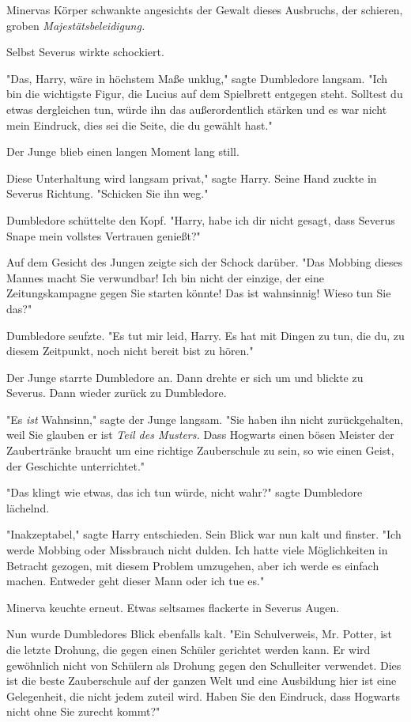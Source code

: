 {Minervas Körper schwankte angesichts der Gewalt dieses Ausbruchs, der schieren, groben \emph{Majestätsbeleidigung.}

Selbst Severus wirkte schockiert.

"Das, Harry, wäre in höchstem Maße unklug," sagte Dumbledore langsam. "Ich bin die wichtigste Figur, die Lucius auf dem Spielbrett entgegen steht. Solltest du etwas dergleichen tun, würde ihn das außerordentlich stärken und es war nicht mein Eindruck, dies sei die Seite, die du gewählt hast."

Der Junge blieb einen langen Moment lang still.

Diese Unterhaltung wird langsam privat," sagte Harry. Seine Hand zuckte in Severus Richtung. "Schicken Sie ihn weg."

Dumbledore schüttelte den Kopf. "Harry, habe ich dir nicht gesagt, dass Severus Snape mein vollstes Vertrauen genießt?"

Auf dem Gesicht des Jungen zeigte sich der Schock darüber. "Das Mobbing dieses Mannes macht Sie verwundbar! Ich bin nicht der einzige, der eine Zeitungskampagne gegen Sie starten könnte! Das ist wahnsinnig! Wieso tun Sie das?"

Dumbledore seufzte. "Es tut mir leid, Harry. Es hat mit Dingen zu tun, die du, zu diesem Zeitpunkt, noch nicht bereit bist zu hören."

Der Junge starrte Dumbledore an. Dann drehte er sich um und blickte zu Severus. Dann wieder zurück zu Dumbledore.

"Es \emph{ist} Wahnsinn," sagte der Junge langsam. "Sie haben ihn nicht zurückgehalten, weil Sie glauben er ist \emph{Teil des Musters.} Dass Hogwarts einen bösen Meister der Zaubertränke braucht um eine richtige Zauberschule zu sein, so wie einen Geist, der Geschichte unterrichtet."

"Das klingt wie etwas, das ich tun würde, nicht wahr?" sagte Dumbledore lächelnd.

"Inakzeptabel," sagte Harry entschieden. Sein Blick war nun kalt und finster. "Ich werde Mobbing oder Missbrauch nicht dulden. Ich hatte viele Möglichkeiten in Betracht gezogen, mit diesem Problem umzugehen, aber ich werde es einfach machen. Entweder geht dieser Mann oder ich tue es."

Minerva keuchte erneut. Etwas seltsames flackerte in Severus Augen.

Nun wurde Dumbledores Blick ebenfalls kalt. "Ein Schulverweis, Mr. Potter, ist die letzte Drohung, die gegen einen Schüler gerichtet werden kann. Er wird gewöhnlich nicht von Schülern als Drohung gegen den Schulleiter verwendet. Dies ist die beste Zauberschule auf der ganzen Welt und eine Ausbildung hier ist eine Gelegenheit, die nicht jedem zuteil wird. Haben Sie den Eindruck, dass Hogwarts nicht ohne Sie zurecht kommt?"

}
